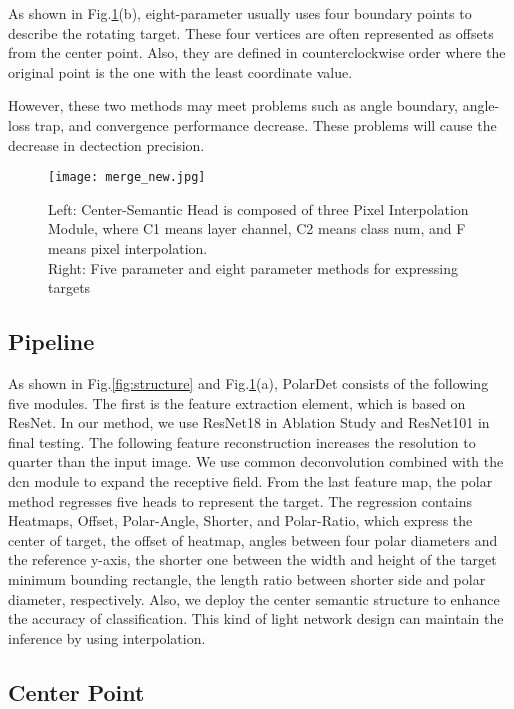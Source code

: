 \documentclass[10pt,twocolumn]{article}
\begin{document}
As shown in Fig.\ref{fig:merge_new}(b), eight-parameter usually uses four boundary points to describe the rotating target. These four vertices are often represented as offsets from the center point. Also, they are defined in counterclockwise order where the original point is the one with the least  coordinate value.

However, these two methods may meet problems such as angle boundary, angle-loss trap, and convergence performance decrease. These problems will cause the decrease in dectection precision.



\begin{figure}[!tb]	
	\centering
\texttt{[image: merge\_new.jpg]}
	\caption{Left: Center-Semantic Head is composed of three Pixel Interpolation Module, where C1 means layer channel, C2 means class num, and F means pixel interpolation.\\Right: Five parameter and eight parameter methods for expressing targets}
	\label{fig:merge_new}
\end{figure}

\subsection{Pipeline}\label{structure}
As shown in Fig.\ref{fig:structure} and Fig.\ref{fig:merge_new}(a), PolarDet consists of the following five modules. The first is the feature extraction element, which is based on ResNet. In our method, we use ResNet18 in Ablation Study and ResNet101 in final testing. The following feature reconstruction increases the resolution to quarter than the input image. We use common deconvolution combined with the dcn module to expand the receptive field. From the last feature map, the polar method regresses five heads to represent the target. The regression contains Heatmaps, Offset, Polar-Angle, Shorter, and Polar-Ratio, which express the center of target, the offset of heatmap, angles between four polar diameters and the reference y-axis, the shorter one between the width and height of the target minimum bounding rectangle, the length ratio between shorter side and polar diameter, respectively. Also, we deploy the center semantic structure to enhance the accuracy of classification. This kind of light network design can maintain the inference by using interpolation.

\subsection{Center Point}\label{center point}
\end{document}
